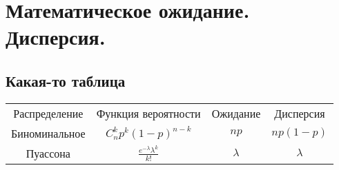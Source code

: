 \documentclass[a4paper, 14pt]{extarticle}
\begin{document}
\section{Математическое ожидание. Дисперсия.}
\subsection{Какая-то таблица}
\begin{center}
\begin{tabular}{cccc}
Распределение & Функция вероятности & Ожидание & Дисперсия\\
Биноминальное & $C_n^kp^k(1-p)^{n-k}$ & $np$ & $np(1-p)$\\
Пуассона & $\frac{e^{-\lambda}\lambda^k}{k!}$ & $\lambda$ & $\lambda$\\
\end{tabular}
\end{center}
\end{document}
